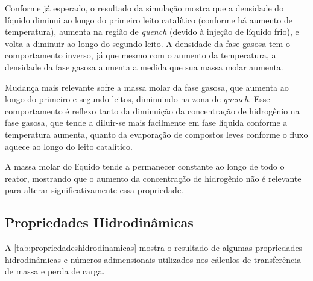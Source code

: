Conforme já esperado, o resultado da simulação mostra que a densidade do
líquido diminui ao longo do primeiro leito catalítico (conforme há aumento de
temperatura), aumenta na região de \emph{quench} (devido à injeção de líquido
frio), e volta a diminuir ao longo do segundo leito. A densidade da fase gasosa
tem o comportamento inverso, já que mesmo com o aumento da temperatura, a
densidade da fase gasosa aumenta a medida que sua massa molar aumenta.

Mudança mais relevante sofre a massa molar da fase gasosa, que aumenta ao
longo do primeiro e segundo leitos, diminuindo na zona de \emph{quench}. Esse
comportamento é reflexo tanto da diminuição da concentração de hidrogênio na
fase gasosa, que tende a diluir-se mais facilmente em fase líquida conforme a
temperatura aumenta, quanto da evaporação de compostos leves conforme o fluxo
aquece ao longo do leito catalítico.

A massa molar do líquido tende a permanecer constante ao longo de todo o
reator, mostrando que o aumento da concentração de hidrogênio não é relevante
para alterar significativamente essa propriedade.

\subsection{Propriedades Hidrodinâmicas} \label{propriedadeshidrodinâmicas}

A \autoref{tab:propriedadeshidrodinamicas} mostra o resultado de algumas
propriedades hidrodinâmicas e números adimensionais utilizados nos cálculos de
transferência de massa e perda de carga.


